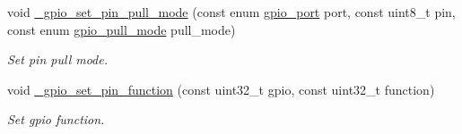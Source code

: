 \begin{DoxyCompactItemize}
void \hyperlink{group___h_p_l_gaa1ce064a63a47651bbb5a0de9faacc86}{\+\_\+gpio\+\_\+set\+\_\+pin\+\_\+pull\+\_\+mode} (const enum \hyperlink{group___h_p_l_ga6d50d8c4b17ff573c07340d4d7965bc1}{gpio\+\_\+port} port, const uint8\+\_\+t pin, const enum \hyperlink{group___h_p_l_gab9959d4bcdc5049e5898d5100ada3197}{gpio\+\_\+pull\+\_\+mode} pull\+\_\+mode)
\begin{DoxyCompactList}\small\item\em Set pin pull mode. \end{DoxyCompactList}\item 
void \hyperlink{group___h_p_l_gac04d9d84160742c076ff2c1063655cee}{\+\_\+gpio\+\_\+set\+\_\+pin\+\_\+function} (const uint32\+\_\+t gpio, const uint32\+\_\+t function)
\begin{DoxyCompactList}\small\item\em Set gpio function. \end{DoxyCompactList}\end{DoxyCompactItemize}
